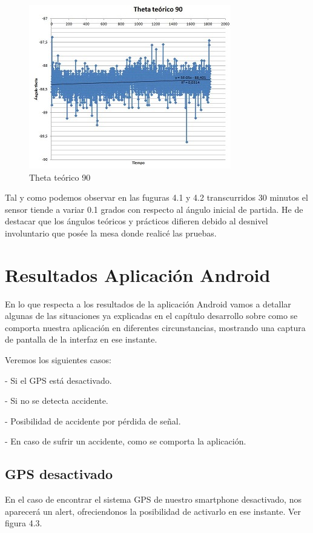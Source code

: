 	\begin{figure}[h]
		\centering
		\includegraphics{imagenes/theta90.jpg}
		\caption{Theta teórico 90}
		\label{contexto:figura}
	\end{figure}
	
	Tal y como podemos observar en las fuguras 4.1 y 4.2 transcurridos 30 minutos el sensor tiende a variar 0.1 grados con respecto al ángulo inicial de partida. He de destacar que los ángulos teóricos y prácticos difieren debido al desnivel involuntario que posée la mesa donde realicé las pruebas.
	
	
	
	\section{Resultados Aplicación Android}
	
		En lo que respecta a los resultados de la aplicación Android vamos a detallar algunas de las situaciones ya explicadas en el capítulo desarrollo sobre como se comporta nuestra aplicación en diferentes circunstancias, mostrando una captura de pantalla de la interfaz en ese instante.
		
		Veremos los siguientes casos:
		
		- Si el GPS está desactivado.
		
		- Si no se detecta accidente.
		
		- Posibilidad de accidente por pérdida de señal.
		
		- En caso de sufrir un accidente, como se comporta la aplicación.	
		
		\subsection{GPS desactivado}
		
			En el caso de encontrar el sistema GPS de nuestro smartphone desactivado, nos aparecerá un alert, ofreciendonos la posibilidad de activarlo en ese instante. Ver figura 4.3.
		
